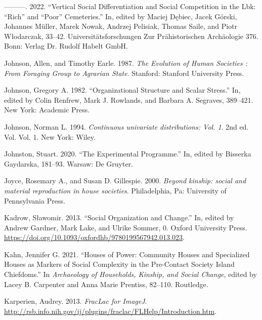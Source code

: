 \documentclass[
  12pt,
  a4paper, twoside]{book}
\newlength{\cslhangindent}
\newlength{\cslentryspacingunit} %
\newenvironment{CSLReferences}[2] %
 {%
  \setlength{\parindent}{0pt}
  \ifodd #1
  \let\oldpar\par
  \def\par{\hangindent=\cslhangindent\oldpar}
  \fi
  \setlength{\parskip}{#2\cslentryspacingunit}
 }%
 {}
\begin{document}
\begin{CSLReferences}{1}{0}
\leavevmode{}%
---------. 2022. {``Vertical Social Differentiation and Social Competition in the Lbk: {``}Rich{''} and {``}Poor{''} Cemeteries.''} In, edited by Maciej Dębiec, Jacek Górski, Johannes Müller, Marek Nowak, Andrzej Pelisiak, Thomas Saile, and Piotr Włodarczak, 33--42. Universitätsforschungen Zur Prähistorischen Archäologie 376. Bonn: Verlag Dr. Rudolf Habelt GmbH.

\leavevmode{}%
Johnson, Allen, and Timothy Earle. 1987. \emph{The Evolution of Human Societies : From Foraging Group to Agrarian State}. Stanford: Stanford University Press.

\leavevmode{}%
Johnson, Gregory A. 1982. {``Organizational Structure and Scalar Stress.''} In, edited by Colin Renfrew, Mark J. Rowlands, and Barbara A. Segraves, 389--421. New York: Academic Press.

\leavevmode{}%
Johnson, Norman L. 1994. \emph{Continuous univariate distributions: Vol. 1}. 2nd ed. Vol. Vol. 1. New York: Wiley.

\leavevmode{}%
Johnston, Stuart. 2020. {``The Experimental Programme.''} In, edited by Bisserka Gaydarska, 181--93. Warsaw: De Gruyter.

\leavevmode{}%
Joyce, Rosemary A., and Susan D. Gillespie. 2000. \emph{Beyond kinship: social and material reproduction in house societies}. Philadelphia, Pa: University of Pennsylvania Press.

\leavevmode{}%
Kadrow, Sławomir. 2013. {``Social Organization and Change.''} In, edited by Andrew Gardner, Mark Lake, and Ulrike Sommer, 0. Oxford University Press. \url{https://doi.org/10.1093/oxfordhb/9780199567942.013.023}.

\leavevmode{}%
Kahn, Jennifer G. 2021. {``Houses of Power: {Community} Houses and Specialized Houses as Markers of Social Complexity in the Pre-Contact {Society Island} Chiefdoms.''} In \emph{Archaeology of {Households}, {Kinship}, and {Social Change}}, edited by Lacey B. Carpenter and Anna Marie Prentiss, 82--110. {Routledge}.

\leavevmode{}%
Karperien, Audrey. 2013. \emph{FracLac for ImageJ}. \url{http://rsb.info.nih.gov/ij/plugins/fraclac/FLHelp/Introduction.htm}.


\end{CSLReferences}
\end{document}
